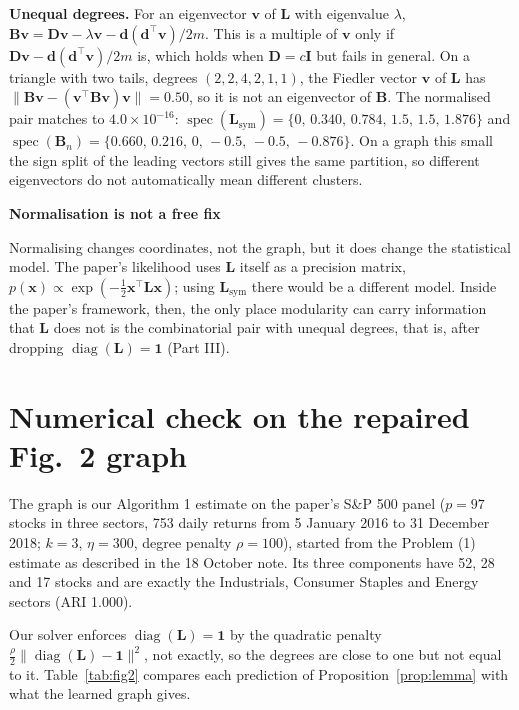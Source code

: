 \documentclass[11pt,a4paper]{article}
\newcommand{\Lap}{\mathbf{L}}
\newcommand{\Bmat}{\mathbf{B}}
\newcommand{\Dmat}{\mathbf{D}}
\newcommand{\Imat}{\mathbf{I}}
\newcommand{\dvec}{\mathbf{d}}
\newcommand{\vvec}{\mathbf{v}}
\newcommand{\one}{\mathbf{1}}
\newcommand{\Lsym}{\Lap_{\mathrm{sym}}}
\theoremstyle{remark}
\newenvironment{aside}[1]
 {\par\vspace{2.5mm}\begin{lrbox}{\asidebox}%
  \begin{minipage}{\dimexpr\textwidth-16pt\relax}\small\textbf{#1}\par\vspace{1mm}}
 {\end{minipage}\end{lrbox}%
  \noindent\setlength{\fboxsep}{7pt}\setlength{\fboxrule}{.4pt}%
  \fcolorbox{Rule}{Panel2}{\usebox{\asidebox}}\par\vspace{2.5mm}}
\begin{document}
\textbf{Unequal degrees.} For an eigenvector $\vvec$ of $\Lap$ with eigenvalue
$\lambda$, $\Bmat\vvec=\Dmat\vvec-\lambda\vvec-\dvec(\dvec^\top\vvec)/2m$. This is a
multiple of $\vvec$ only if $\Dmat\vvec-\dvec(\dvec^\top\vvec)/2m$ is, which holds when
$\Dmat=c\Imat$ but fails in general. On a triangle with two tails, degrees
$(2,2,4,2,1,1)$, the Fiedler vector $\vvec$ of $\Lap$ has
$\lVert\Bmat\vvec-(\vvec^\top\Bmat\vvec)\vvec\rVert=0.50$, so it is not an eigenvector
of $\Bmat$. The normalised pair matches to $4.0\times10^{-16}$:
$\operatorname{spec}(\Lsym)=\{0,\,0.340,\,0.784,\,1.5,\,1.5,\,1.876\}$ and
$\operatorname{spec}(\Bmat_n)=\{0.660,\,0.216,\,0,\,-0.5,\,-0.5,\,-0.876\}$. On a
graph this small the sign split of the leading vectors still gives the same
partition, so different eigenvectors do not automatically mean different clusters.

\begin{aside}{Normalisation is not a free fix}
Normalising changes coordinates, not the graph, but it does change the statistical
model. The paper's likelihood uses $\Lap$ itself as a precision matrix,
$p(\mathbf x)\propto\exp(-\tfrac12\mathbf x^\top\Lap\mathbf x)$; using $\Lsym$ there
would be a different model. Inside the paper's framework, then, the only place
modularity can carry information that $\Lap$ does not is the combinatorial pair with
unequal degrees, that is, after dropping $\operatorname{diag}(\Lap)=\one$ (Part III).
\end{aside}

\section{Numerical check on the repaired Fig.~2 graph}\label{sec:fig2}

The graph is our Algorithm 1 estimate on the paper's S\&P 500 panel ($p=97$ stocks in
three sectors, 753 daily returns from 5 January 2016 to 31 December 2018; $k=3$,
$\eta=300$, degree penalty $\rho=100$), started from the Problem (1) estimate as
described in the 18 October note. Its three components have 52, 28 and 17 stocks and
are exactly the Industrials, Consumer Staples and Energy sectors (ARI 1.000).

Our solver enforces $\operatorname{diag}(\Lap)=\one$ by the quadratic penalty
$\tfrac\rho2\lVert\operatorname{diag}(\Lap)-\one\rVert^2$, not exactly, so the degrees
are close to one but not equal to it. Table~\ref{tab:fig2} compares each prediction of
Proposition~\ref{prop:lemma} with what the learned graph gives.
\end{document}
